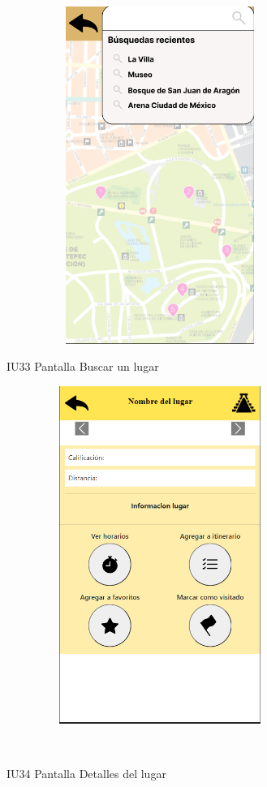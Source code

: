 \begin{figure}[htb]
    \begin{minipage}{1\textwidth}
    \centering
    \includegraphics[width=10cm, height=11cm]{entregable final/pantallasSistema/IU33 Pantalla Buscar un lugar.png}
    \caption{IU33 Pantalla Buscar un lugar}
\end{minipage}

    \begin{minipage}{1\textwidth}
        \centering
        \includegraphics[width=10cm, height=11cm]{entregable final/pantallasSistema/IU34 Pantalla Detalles del lugar.png}
        \caption{IU34 Pantalla Detalles del lugar}
    \end{minipage}
    \\
\end{figure}
